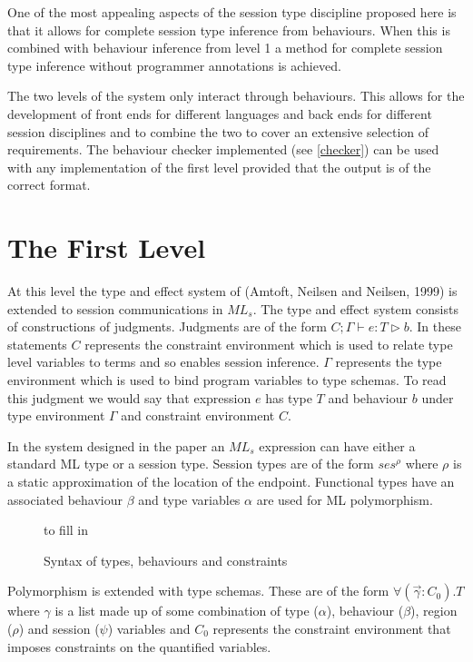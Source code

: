 One of the most appealing aspects of the session type discipline proposed here is that it allows for complete session type inference from behaviours. When this is combined with behaviour inference from level 1 a method for complete session type inference without programmer annotations is achieved. 

The two levels of the system only interact through behaviours. This allows for the development of front ends for different languages and back ends for different session disciplines and to combine the two to cover an extensive selection of requirements. The behaviour checker implemented (see \ref{checker}) can be used with any implementation of the first level provided that the output is of the correct format.

\section{The First Level} \label{level1}

At this level the type and effect system of (Amtoft, Neilsen and Neilsen, 1999) \cite{amtoft} is extended to session communications in $ML_s$. The type and effect system consists of constructions of judgments. Judgments are of the form $C;\Gamma \vdash e : T \triangleright b$. In these statements $C$ represents the constraint environment which is used to relate type level variables to terms and so enables session inference. $\Gamma$ represents the type environment which is used to bind program variables to type schemas. To read this judgment we would say that expression $e$ has type $T$ and behaviour $b$ under type environment $\Gamma$ and constraint environment $C$.

In the system designed in the paper an $ML_s$ expression can have either a standard ML type or a session type. Session types are of the form $ses^\rho$ where $\rho$ is a static approximation of the location of the endpoint. Functional types have an associated behaviour $\beta$ and type variables $\alpha$ are used for ML polymorphism. 

\begin{figure}
to fill in

\caption{Syntax of types, behaviours and constraints}
\label{syntaxTypes}
\end{figure}

Polymorphism is extended with type schemas. These are of the form $\forall(\overrightarrow{\gamma}:C_0).T$ where $\gamma$ is a list made up of some combination of type ($\alpha$), behaviour ($\beta$), region ($\rho$) and session ($\psi$) variables and $C_0$ represents the constraint environment that imposes constraints on the quantified variables. 

